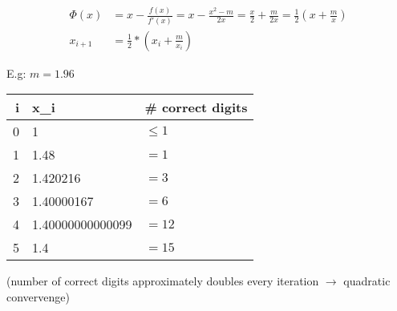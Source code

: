 \begin{align*}
    \Phi(x)&=x- \frac{f(x)}{f'(x)}= x- \frac{x^2-m}{2x}= \frac{x}{2}+ \frac{m}{2x} = \frac{1}{2} \left( x+ \frac{m}{x} \right)\\
    x_{i+1} &= \frac{1}{2}*\left(x_i+\frac{m}{x_i} \right)
\end{align*}

E.g: $m=1.96$
\begin{center}
    \begin{tabular}{r l l}
        \toprule
        i & x_i              & \# correct digits \\
        \midrule
        0 & 1                & $\leq 1$          \\
        1 & 1.48             & $=1$              \\
        2 & 1.420216         & $=3$              \\
        3 & 1.40000167       & $=6$              \\
        4 & 1.40000000000099 & $=12$             \\
        5 & 1.4              & $=15$             \\
        \bottomrule
    \end{tabular}
\end{center}
(number of correct digits approximately doubles every iteration $\to$ quadratic convervenge)

